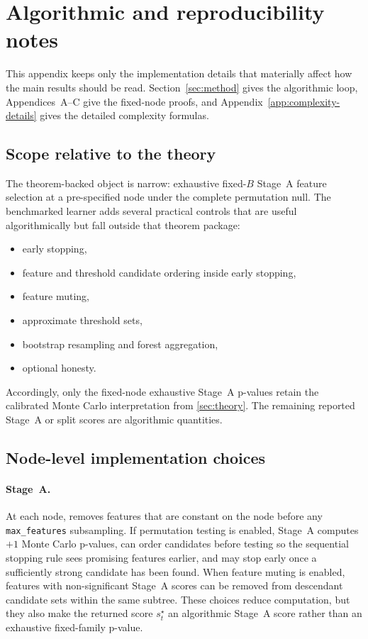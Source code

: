 \section{Algorithmic and reproducibility notes}
\label{app:methods}

This appendix keeps only the implementation details that materially affect how
the main results should be read. Section~\ref{sec:method} gives the algorithmic
loop, Appendices~A--C give the fixed-node proofs, and Appendix~\ref{app:complexity-details}
gives the detailed complexity formulas.

\subsection{Scope relative to the theory}

The theorem-backed object is narrow: exhaustive fixed-$B$ Stage~A feature selection at a
pre-specified node under the complete permutation null. The benchmarked learner
adds several practical controls that are useful algorithmically but fall outside
that theorem package:
\begin{itemize}
  \item early stopping,
  \item feature and threshold candidate ordering inside early stopping,
  \item feature muting,
  \item approximate threshold sets,
  \item bootstrap resampling and forest aggregation,
  \item optional honesty.
\end{itemize}
Accordingly, only the fixed-node exhaustive Stage~A p-values retain the
calibrated Monte Carlo interpretation from \cref{sec:theory}. The remaining
reported Stage~A or split scores are algorithmic quantities.

\subsection{Node-level implementation choices}

\paragraph{Stage~A.}
At each node, \citrees removes features that are constant on the node before any
\texttt{max\_features} subsampling. If permutation testing is enabled, Stage~A
computes $+1$ Monte Carlo p-values, can order candidates before testing so the
sequential stopping rule sees promising features earlier, and may stop early
once a sufficiently strong candidate has been found. When feature muting is
enabled, features with non-significant Stage~A scores can be removed from
descendant candidate sets within the same subtree. These choices reduce
computation, but they also make the returned score $s_t^\star$ an algorithmic
Stage~A score rather than an exhaustive fixed-family p-value.

